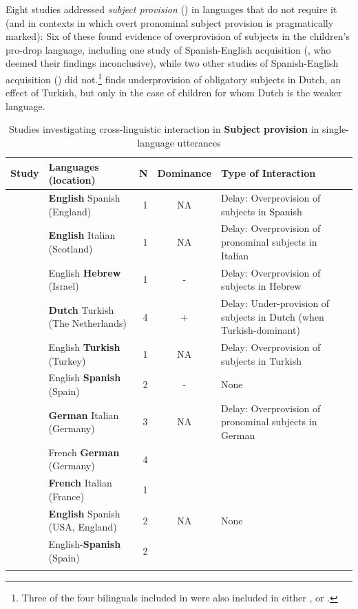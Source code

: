 \documentclass[output=paper]{langscibook}
\begin{document}
Eight studies addressed \textit{subject provision} () in languages that do not require it (and in contexts in which overt pronominal subject provision is pragmatically marked): Six of these found evidence of overprovision of subjects in the children’s pro-drop language, including one study of Spanish-English acquisition (\citealt{ParadisNavarro2003}, who deemed their findings inconclusive), while two other studies of Spanish-English acquisition (\citealt{LicerasEtAl2012,Villa-GarciaSuarez2016}) did not.\footnote{Three of the four bilinguals included in \citet{Villa-GarcíaSuarez2016} were also included in either \citet{ParadisNavarro2003}, or \citet{LicerasEtAl2012}.} \citet{Blom2010} finds underprovision of obligatory subjects in Dutch, an effect of Turkish, but only in the case of children for whom Dutch is the weaker language.

\begin{table}\small
\begin{tabularx}{\textwidth}{QQ@{}rcQ}
\lsptoprule
{ Study} & { Languages}  { (location)} & { N}  & {{ Dominance}} & { Type of Interaction}\\
\midrule
\citet{ParadisNavarro2003} & \textbf{English} Spanish (England) & 1 & {NA} & Delay: Overprovision of subjects in Spanish\\
\tablevspace
\citet{Serratrice2004} & \textbf{English} Italian (Scotland) & 1 & {NA} & Delay: Overprovision of pronominal subjects in Italian\\
\tablevspace
\citet{HacohenSchaeffer2007} & English \textbf{Hebrew} (Israel) & 1 & {-}
& Delay: Overprovision of subjects in Hebrew\\
\tablevspace
\citet{Blom2010} & \textbf{Dutch} Turkish (The Netherlands) & 4 & {+} & Delay: Under-provision of subjects in Dutch (when Turkish-dominant)\\
\tablevspace
\citet{Haznedar2010} & English \textbf{Turkish} (Turkey) & 1 & {NA} & Delay: Overprovision of subjects in Turkish \\
\tablevspace
\citet{LicerasEtAl2012} & English \textbf{Spanish} (Spain) & 2 & {-} & None\\
\tablevspace
\citet{SchmitzEtAl2012} & \textbf{German} Italian (Germany) & 3 & NA & {Delay: Overprovision of pronominal subjects in German}\\
                       & French \textbf{German} (Germany) & 4 &  &   \\
                      & \textbf{French} Italian (France) & 1 &  &   \\
\tablevspace
\citet{Villa-García2SuárezPalma016} & \textbf{English} Spanish (USA, England) & 2 & NA & {None}\\
                              & English-\textbf{Spanish} (Spain) & 2 &  &   \\
\lspbottomrule
\end{tabularx}
\caption{Studies investigating cross-linguistic interaction in \textbf{Subject} \textbf{provision} in single-language utterances}
\label{tab:vihmannvihmann:5}
\end{table}
\end{document}
